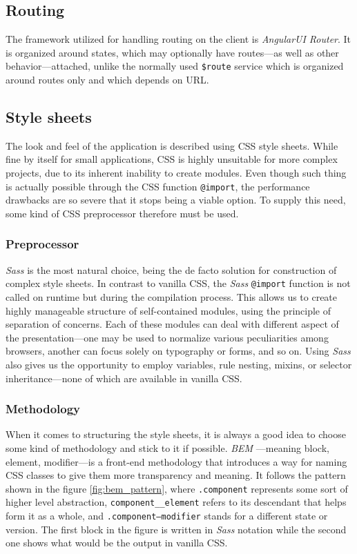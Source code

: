 \documentclass[thesis=M,english,hidelinks]{FITthesis}[2012/10/20]
\newcommand{\code}{\texttt}
\begin{document}
  \subsection{Routing}

The framework utilized for handling routing on the client is \textit{AngularUI Router}. It is organized around states, which may optionally have routes---as well as other behavior---attached, unlike the normally used \code{\$route} service which is organized around routes only and which depends on URL.

  \subsection{Style sheets}

The look and feel of the application is described using CSS style sheets. While fine by itself for small applications, CSS is highly unsuitable for more complex projects, due to its inherent inability to create modules. Even though such thing is actually possible through the CSS function \code{@import}, the performance drawbacks are so severe that it stops being a viable option. To supply this need, some kind of CSS preprocessor therefore must be used.

    \subsubsection{Preprocessor}

\textit{Sass} \cite{sass} is the most natural choice, being the de facto solution for construction of complex style sheets. In contrast to vanilla CSS, the \textit{Sass} \code{@import} function is not called on runtime but during the compilation process. This allows us to create highly manageable structure of self-contained modules, using the principle of separation of concerns. Each of these modules can deal with different aspect of the presentation---one may be used to normalize various peculiarities among browsers, another can focus solely on typography or forms, and so on. Using \textit{Sass} also gives us the opportunity to employ variables, rule nesting, mixins, or selector inheritance---none of which are available in vanilla CSS.

    \subsubsection{Methodology}

When it comes to structuring the style sheets, it is always a good idea to choose some kind of methodology and stick to it if possible. \textit{BEM} \cite{bem}---meaning block, element, modifier---is a front-end methodology that introduces a way for naming CSS classes to give them more transparency and meaning. It follows the pattern shown in the figure \ref{fig:bem_pattern}, where \code{.component} represents some sort of higher level abstraction, \code{component\_\_element} refers to its descendant that helps form it as a whole, and \code{.component--modifier} stands for a different state or version. The first block in the figure is written in \textit{Sass} notation while the second one shows what would be the output in vanilla CSS.
\end{document}
